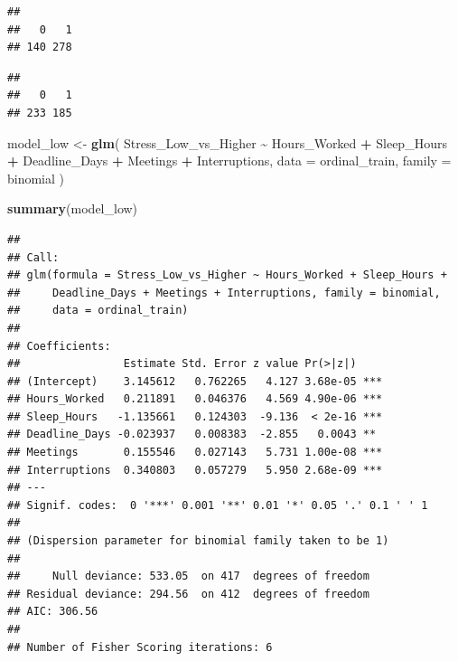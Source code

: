 \documentclass[
]{article}
\newenvironment{Shaded}{\begin{snugshade}}{\end{snugshade}}
\newcommand{\AttributeTok}[1]{\textcolor[rgb]{0.13,0.29,0.53}{#1}}
\newcommand{\FunctionTok}[1]{\textcolor[rgb]{0.13,0.29,0.53}{\textbf{#1}}}
\newcommand{\NormalTok}[1]{#1}
\newcommand{\OtherTok}[1]{\textcolor[rgb]{0.56,0.35,0.01}{#1}}
\newcommand{\SpecialCharTok}[1]{\textcolor[rgb]{0.81,0.36,0.00}{\textbf{#1}}}
\begin{document}
\begin{Shaded}
\end{Shaded}

\begin{verbatim}
## 
##   0   1 
## 140 278
\end{verbatim}

\begin{Shaded}
\end{Shaded}

\begin{verbatim}
## 
##   0   1 
## 233 185
\end{verbatim}

\begin{Shaded}
\begin{Highlighting}[]
\NormalTok{model\_low }\OtherTok{\textless{}{-}} \FunctionTok{glm}\NormalTok{(}
\NormalTok{  Stress\_Low\_vs\_Higher }\SpecialCharTok{\textasciitilde{}}\NormalTok{ Hours\_Worked }\SpecialCharTok{+}\NormalTok{ Sleep\_Hours }\SpecialCharTok{+}
\NormalTok{    Deadline\_Days }\SpecialCharTok{+}\NormalTok{ Meetings }\SpecialCharTok{+}\NormalTok{ Interruptions,}
  \AttributeTok{data =}\NormalTok{ ordinal\_train,}
  \AttributeTok{family =}\NormalTok{ binomial}
\NormalTok{)}

\FunctionTok{summary}\NormalTok{(model\_low)}
\end{Highlighting}
\end{Shaded}

\begin{verbatim}
## 
## Call:
## glm(formula = Stress_Low_vs_Higher ~ Hours_Worked + Sleep_Hours + 
##     Deadline_Days + Meetings + Interruptions, family = binomial, 
##     data = ordinal_train)
## 
## Coefficients:
##                Estimate Std. Error z value Pr(>|z|)    
## (Intercept)    3.145612   0.762265   4.127 3.68e-05 ***
## Hours_Worked   0.211891   0.046376   4.569 4.90e-06 ***
## Sleep_Hours   -1.135661   0.124303  -9.136  < 2e-16 ***
## Deadline_Days -0.023937   0.008383  -2.855   0.0043 ** 
## Meetings       0.155546   0.027143   5.731 1.00e-08 ***
## Interruptions  0.340803   0.057279   5.950 2.68e-09 ***
## ---
## Signif. codes:  0 '***' 0.001 '**' 0.01 '*' 0.05 '.' 0.1 ' ' 1
## 
## (Dispersion parameter for binomial family taken to be 1)
## 
##     Null deviance: 533.05  on 417  degrees of freedom
## Residual deviance: 294.56  on 412  degrees of freedom
## AIC: 306.56
## 
## Number of Fisher Scoring iterations: 6
\end{verbatim}
\end{document}

